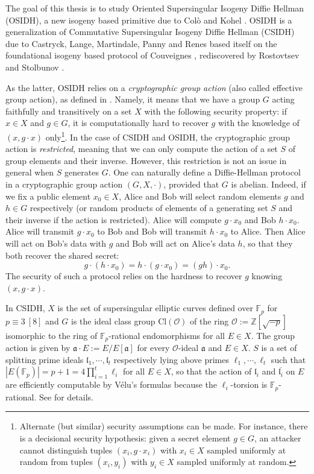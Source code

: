 \documentclass[a4paper,10pt,notitlepage]{report}
\theoremstyle{definition}
\theoremstyle{plain}
\theoremstyle{definition}
\newcommand{\Z}{\mathbb{Z}}
\newcommand{\F}{\mathbb{F}}
\newcommand{\mO}{\mathcal{O}}
\renewcommand{\(}{\left(}
\renewcommand{\)}{\right)}
\newcommand{\mf}[1]{\mathfrak{#1}}
\begin{document}
The goal of this thesis is to study Oriented Supersingular Isogeny Diffie Hellman (OSIDH), a new isogeny based primitive due to Col\`{o} and Kohel \cite{OSIDH}. OSIDH is a generalization of Commutative Supersingular Isogeny Diffie Hellman (CSIDH) \cite{CSIDH} due to Castryck, Lange, Martindale, Panny and Renes based itself on the foundational isogeny based protocol of Couveignes \cite{Couveignes}, rediscovered by Rostovtsev and Stolbunov \cite{RosSto}. 

As the latter, OSIDH relies on a \emph{cryptographic group action} (also called effective group action), as defined in \cite{DeFeo1}. Namely, it means that we have a group $G$ acting faithfully and transitively on a set $X$ with the following security property: if $x\in X$ and $g\in G$, it is computationally hard to recover $g$ with the knowledge of $(x,g\cdot x)$ only\footnote{Alternate (but similar) security assumptions can be made. For instance, there is a decisional security hypothesis: given a secret element $g\in G$, an attacker cannot distinguish tuples $(x_i, g\cdot x_i)$ with $x_i\in X$ sampled uniformly at random from tuples $(x_i,y_i)$ with $y_i\in X$ sampled uniformly at random.}. In the case of CSIDH and OSIDH, the cryptographic group action is \emph{restricted}, meaning that we can only compute the action of a set $S$ of group elements and their inverse. However, this restriction is not an issue in general when $S$ generates $G$. One can naturally define a Diffie-Hellman protocol in a cryptographic group action $(G,X,\cdot)$, provided that $G$ is abelian. Indeed, if we fix a public element $x_0\in X$, Alice and Bob will select random elements $g$ and $h\in G$ respectively (or random products of elements of a generating set $S$ and their inverse if the action is restricted). Alice will compute $g\cdot x_0$ and Bob $h\cdot x_0$. Alice will transmit $g\cdot x_0$ to Bob and Bob will transmit $h\cdot x_0$ to Alice. Then Alice will act on Bob's data with $g$ and Bob will act on Alice's data $h$, so that they both recover the shared secret:
\[g\cdot(h\cdot x_0)=h\cdot(g\cdot x_0)=(gh)\cdot x_0.\]
The security of such a protocol relies on the hardness to recover $g$ knowing $(x,g\cdot x)$.

In CSIDH,  $X$ is the set of supersingular elliptic curves defined over $\F_p$ for $p\equiv 3 \ [8]$ and $G$ is the ideal class group $\mbox{Cl}(\mO)$ of the ring $\mO:=\Z[\sqrt{-p}]$ isomorphic to the ring of $\F_p$-rational endomorphisms for all $E\in X$. The group action is given by $\mf{a}\cdot E:=E/E[\mf{a}]$ for every $\mO$-ideal $\mf{a}$ and $E\in X$. $S$ is a set of splitting prime ideals $\mf{l}_1, \cdots, \mf{l}_t$ respectively lying above primes $\ell_1, \cdots, \ell_t$ such that $|E(\F_p)|=p+1=4\prod_{i=1}^t\ell_i$ for all $E\in X$, so that the action of $\mf{l}_i$ and $\overline{\mf{l}_i}$ on $E$ are efficiently computable by V\'{e}lu's formulas \cite{Velu} because the $\ell_i$-torsion is $\F_p$-rational.  See \cite{CSIDH} for details.  
\end{document}
